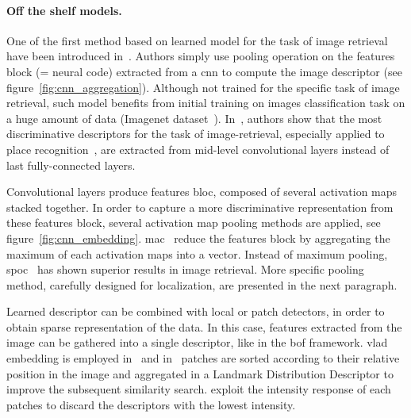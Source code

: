 \paragraph{Off the shelf models.} One of the first method based on learned model for the task of image retrieval have been introduced in~\citep{Babenko2014}. Authors simply use pooling operation on the features block (= neural code) extracted from a \ac{cnn} to compute the image descriptor (see figure~\ref{fig:cnn_aggregation}). Although not trained for the specific task of image retrieval, such model benefits from initial training on images classification task on a huge amount of data (\eg Imagenet dataset~\citep{Deng2009}). In~\citep{Babenko2014,Sunderhauf2015}, authors show that the most discriminative descriptors for the task of image-retrieval, especially applied to place recognition~\citep{Sunderhauf2015}, are extracted from mid-level convolutional layers instead of last fully-connected layers. 

Convolutional layers produce features bloc, composed of several activation maps stacked together. In order to capture a more discriminative representation from these features block, several activation map pooling methods are applied, see figure~\ref{fig:cnn_embedding}. \ac{mac}~\citep{Razavian2014a} reduce the features block by aggregating the maximum of each activation maps into a vector. Instead of maximum pooling, \ac{spoc}~\citep{Babenko2015} has shown superior results in image retrieval. More specific pooling method, carefully designed for localization, are presented in the next paragraph.

Learned descriptor can be combined with local or patch detectors, in order to obtain sparse representation of the data. In this case, features extracted from the image can be gathered into a single descriptor, like in the \ac{bof} framework. \ac{vlad} embedding is employed in~\citep{Yan2016} and in~\citep{Panphattarasap2016} patches are sorted according to their relative position in the image and aggregated in a Landmark Distribution Descriptor to improve the subsequent similarity search. \citet{Zhi2016} exploit the intensity response of each patches to discard the descriptors with the lowest intensity.


